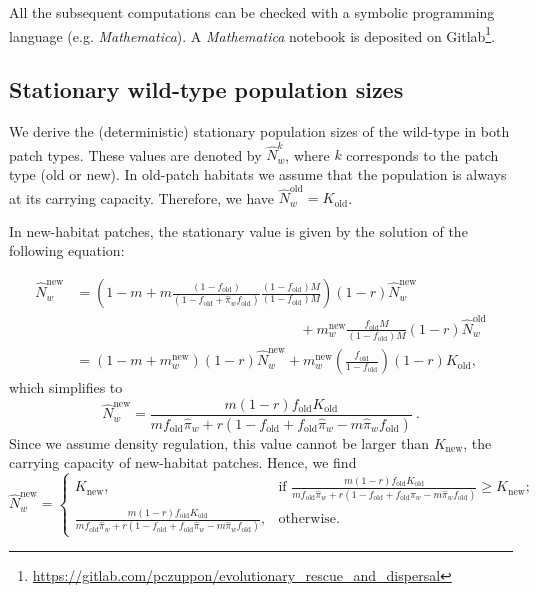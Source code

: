 \documentclass[a4paper,11pt]{scrartcl}
\begin{document}
All the subsequent computations can be checked with a symbolic programming language (e.g. \textit{Mathematica}). A \textit{Mathematica} notebook is deposited on Gitlab\footnote{\url{https://gitlab.com/pczuppon/evolutionary\_rescue\_and\_dispersal}}.

\subsection*{Stationary wild-type population sizes}
We derive the (deterministic) stationary population sizes of the wild-type in both patch types. These values are denoted by $\widehat{N}_w^{k}$, where $k$ corresponds to the patch type (old or new). In old-patch habitats we assume that the population is always at its carrying capacity. Therefore, we have $\widehat{N}_w^{\text{old}} = K_{\text{old}}$.

In new-habitat patches, the stationary value is given by the solution of the following equation:

 \begin{equation}\label{Seq:wt_deme2}
	\begin{aligned}
		\widehat{N}_w^{\text{new}} &= \left(1-m + m\frac{(1-f_{\text{old}})}{(1-f_{\text{old}}+\widehat{\pi}_w f_{\text{old}})} \frac{(1-f_{\text{old}})M}{(1-f_{\text{old}})M}\right)(1-r)\widehat{N}_w^{\text{new}} \\
		&\qquad \qquad \qquad \qquad \qquad \qquad \qquad \qquad + m_w^{\text{new}} \frac{f_{\text{old}} M}{(1-f_{\text{old}})M} (1-r)  \widehat{N}_w^{\text{old}}\\
		 &= \left(1-m+m_w^{\text{new}} \right)(1-r)\widehat{N}_w^{\text{new}} + m_w^{\text{new}} \left(\frac{f_{\text{old}}}{1-f_{\text{old}}}\right) (1-r)  K_{\text{old}},
	\end{aligned}
\end{equation}
%
which simplifies to
%
\begin{equation}
	\widehat{N}_w^{\text{new}} = \frac{m (1-r) f_{\text{old}}  K_{\text{old}}}{m f_{\text{old}} \widehat{\pi}_w + r(1-f_{\text{old}}+f_{\text{old}}\widehat{\pi}_w -m \widehat{\pi}_w f_{\text{old}})}\ .
\end{equation}
%
Since we assume density regulation, this value cannot be larger than $K_{\text{new}}$, the carrying capacity of new-habitat patches. Hence, we find
\begin{equation}
	\widehat{N}_w^{\text{new}} =\left\{ \begin{array}{ll} 
		K_{\text{new}}, & \text{if }\frac{m (1-r) f_{\text{old}}  K_{\text{old}}}{m f_{\text{old}} \widehat{\pi}_w + r(1-f_{\text{old}}+f_{\text{old}}\widehat{\pi}_w -m \widehat{\pi}_w f_{\text{old}})}\geq K_{\text{new}}; \\
		\frac{m (1-r) f_{\text{old}} K_{\text{old}}
		}{m f_{\text{old}} \widehat{\pi}_w + r(1-f_{\text{old}}+f_{\text{old}}\widehat{\pi}_w -m \widehat{\pi}_w f_{\text{old}})}, & \text{otherwise}.
	\end{array}\right.
\end{equation} 
\end{document}
